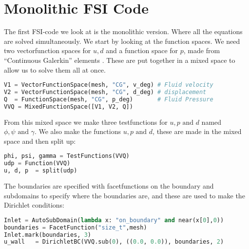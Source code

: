 \chapter*{Monolithic FSI Code}



The first FSI-code we look at is the monolithic version. Where all the equations are solved simultaneously. \newline
We start by looking at the function spaces. We need two vectorfunction spaces for $u,d$ and a function space for $p$, made from ``Continuous Galerkin''  elements . These are put together in a mixed space to allow us to solve them all at once.
\begin{lstlisting}[language=Python]
V1 = VectorFunctionSpace(mesh, "CG", v_deg) # Fluid velocity
V2 = VectorFunctionSpace(mesh, "CG", d_deg) # displacement
Q  = FunctionSpace(mesh, "CG", p_deg)       # Fluid Pressure
VVQ = MixedFunctionSpace([V1, V2, Q])
\end{lstlisting}
From this mixed space we make three testfunctions for $ u,p \text{ and }d$ named $\phi, \psi \text{ and } \gamma$. We also make the functions  $ u,p \text{ and }d$, these are made in the mixed space and then split up:

\begin{lstlisting}[language=Python]
phi, psi, gamma = TestFunctions(VVQ)
udp = Function(VVQ)
u, d, p  = split(udp)
\end{lstlisting}

The boundaries are specified with facetfunctions on the boundary and subdomains to specify where the boundaries are,  and these are used to make the Dirichlet conditions:

\begin{lstlisting}[language=Python]
Inlet = AutoSubDomain(lambda x: "on_boundary" and near(x[0],0))
boundaries = FacetFunction("size_t",mesh)
Inlet.mark(boundaries, 3)
u_wall   = DirichletBC(VVQ.sub(0), ((0.0, 0.0)), boundaries, 2)
\end{lstlisting}

